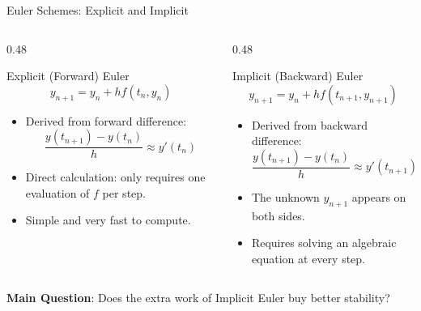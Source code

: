 \documentclass[aspectratio=169,10pt]{beamer}
\begin{document}
\begin{frame}{Euler Schemes: Explicit and Implicit}
  \begin{columns}[onlytextwidth,T]
    \begin{column}{0.48\textwidth}
      \begin{block}{Explicit (Forward) Euler}
        \[
          y_{n+1} = y_n + h f(t_n, y_n)
        \]
        \begin{itemize}
          \item Derived from forward difference:
          \[
            \frac{y(t_{n+1}) - y(t_n)}{h} \approx y'(t_n)
          \]
          \item Direct calculation: only requires one evaluation of $f$ per step.
          \item Simple and very fast to compute.
        \end{itemize}
      \end{block}
    \end{column}

    \begin{column}{0.48\textwidth}
      \begin{block}{Implicit (Backward) Euler}
        \[
          y_{n+1} = y_n + h f(t_{n+1}, y_{n+1})
        \]
        \begin{itemize}
          \item Derived from backward difference:
          \[
            \frac{y(t_{n+1}) - y(t_n)}{h} \approx y'(t_{n+1})
          \]
          \item The unknown $y_{n+1}$ appears on both sides.
          \item Requires solving an algebraic equation at every step.
        \end{itemize}
      \end{block}
    \end{column}
  \end{columns}

  \vspace{0.3cm}
  \textbf{Main Question}: Does the extra work of Implicit Euler buy better stability?
\end{frame}
\end{document}
